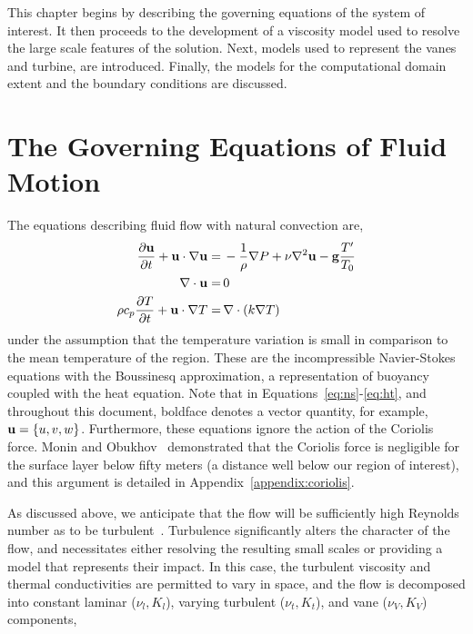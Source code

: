 This chapter begins by describing the governing equations of the system
of interest. It then proceeds to the development of a viscosity model
used to resolve the large scale features of the solution. Next, models
used to represent the vanes and turbine, are introduced.  Finally, the
models for the computational domain extent and the boundary conditions
are discussed. 


\section{The Governing Equations of Fluid Motion}
\label{sub_sec:ns_en}

The equations describing fluid flow with natural convection are,
\begin{align}
  \frac{\partial {\bf u}}{\partial t} + {\bf u} \cdot \nabla {\bf u} =& \,
  -\frac{1}{\rho}\nabla P + \nu \nabla^2 {\bf u} - {\bf g} \frac{T'}{T_0}
 \label{eq:ns} \\
  \nabla \cdot {\bf u} =& \, 0 \label{eq:cont} \\
  \rho c_p \frac{\partial T}{\partial t} + {\bf u} \cdot \nabla T =& \, \nabla
 \cdot ( k \nabla T) \label{eq:ht}
\end{align} 
under the assumption that the temperature variation is small in
comparison to the mean temperature of the region. These are the
incompressible Navier-Stokes equations with the Boussinesq
approximation\cite{boussinesq2010théorie}, a representation of buoyancy
coupled with the heat equation. Note that in
Equations~\ref{eq:ns}-\ref{eq:ht}, and throughout this document,
boldface denotes a vector quantity, for example, ${\bf u} = \{u,v,w\}$.  
Furthermore, these equations ignore the action of the Coriolis force. 
Monin and Obukhov~\cite{monin1954basic} demonstrated that the Coriolis
force is negligible for the surface layer below fifty meters (a distance
well below our region of interest), and this argument is detailed in
Appendix~\ref{appendix:coriolis}.  

As discussed above, we anticipate that the flow will be sufficiently
high Reynolds number as to be
turbulent~\cite{Reynolds01011883}. Turbulence significantly alters the
character of the flow,  
and necessitates either resolving the resulting small scales or
providing a model that represents their impact. In this case, 
the turbulent viscosity and thermal conductivities are permitted to vary in
space, and the flow is decomposed into constant laminar
($\nu_{l},K_{l}$), varying turbulent ($\nu_{t},K_{t}$), and vane
($\nu_{V},K_{V}$) components, 


